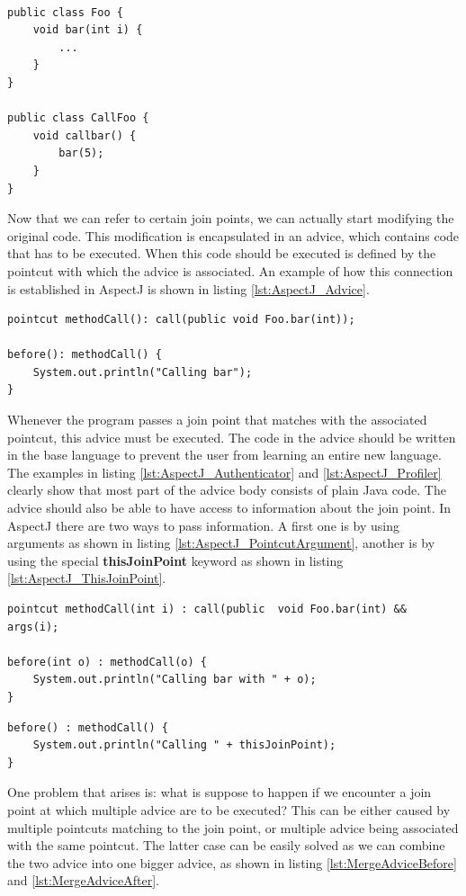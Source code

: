 \documentclass[a4paper]{report}
\begin{document}
\\
\begin{lstlisting}[caption=Example Java code.,label=lst:AspectJ_JoinPointShadow]
public class Foo {
	void bar(int i) {
		...
	}
}

public class CallFoo {
	void callbar() {
		bar(5);
	}
}
\end{lstlisting}
Now that we can refer to certain join points, we can actually start modifying the original code. This modification is encapsulated in an advice, which contains code that has to be executed. When this code should be executed is defined by the pointcut with which the advice is associated. An example of how this connection is established in AspectJ is shown in listing \ref{lst:AspectJ_Advice}.
\begin{lstlisting}[caption=An example of an advice.,label=lst:AspectJ_Advice]
pointcut methodCall(): call(public void Foo.bar(int));

before(): methodCall() {
	System.out.println("Calling bar");
}
\end{lstlisting}
Whenever the program passes a join point that matches with the associated pointcut, this advice must be executed. The code in the advice should be written in the base language to prevent the user from learning an entire new language. The examples in listing \ref{lst:AspectJ_Authenticator} and \ref{lst:AspectJ_Profiler} clearly show that most part of the advice body consists of plain Java code. The advice should also be able to have access to information about the join point. In AspectJ there are two ways to pass information. A first one is by using arguments as shown in listing \ref{lst:AspectJ_PointcutArgument}, another is by using the special \textbf{thisJoinPoint} keyword as shown in listing \ref{lst:AspectJ_ThisJoinPoint}.
\begin{lstlisting}[caption=Example of argument passing between pointcut and join point.,label=lst:AspectJ_PointcutArgument]
pointcut methodCall(int i) : call(public  void Foo.bar(int) && args(i);

before(int o) : methodCall(o) {
	System.out.println("Calling bar with " + o);
}
\end{lstlisting}
\begin{lstlisting}[caption=Example of using the thisJoinPoint keyword.,label=lst:AspectJ_ThisJoinPoint]
before() : methodCall() {
	System.out.println("Calling " + thisJoinPoint);
}
\end{lstlisting}
One problem that arises is: what is suppose to happen if we encounter a join point at which multiple advice are to be executed? This can be either caused by multiple pointcuts matching to the join point, or multiple advice being associated with the same pointcut. The latter case can be easily solved as we can combine the two advice into one bigger advice, as shown in listing \ref{lst:MergeAdviceBefore} and \ref{lst:MergeAdviceAfter}.\\
\end{document}
